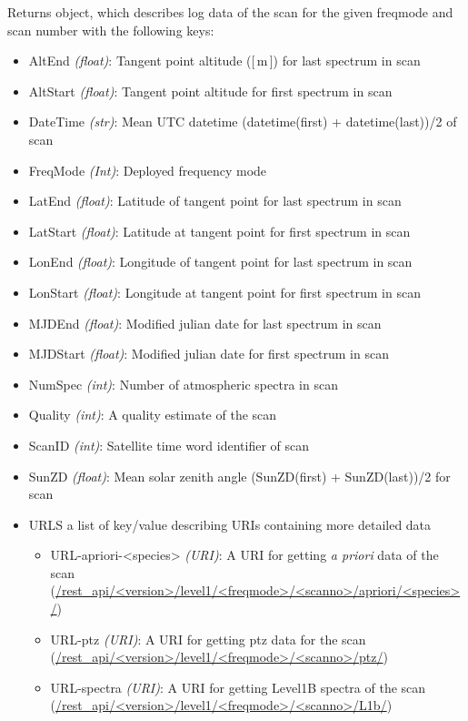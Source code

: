 Returns object, which describes log data of the scan for the given freqmode and scan number
with the following keys:


\begin{itemize}
    \item AltEnd \emph{(float)}: Tangent point altitude ([\,m\,]) for last spectrum in scan
    \item AltStart \emph{(float)}: Tangent point altitude for first spectrum in scan
    \item DateTime \emph{(str)}: Mean UTC datetime (datetime(first) + datetime(last))/2 of scan
    \item FreqMode \emph{(Int)}: Deployed frequency mode
    \item LatEnd \emph{(float)}: Latitude of tangent point for last spectrum in scan
    \item LatStart \emph{(float)}: Latitude at tangent point for first spectrum in scan
    \item LonEnd \emph{(float)}: Longitude of tangent point for last spectrum in scan
    \item LonStart \emph{(float)}: Longitude at tangent point for first spectrum in scan
    \item MJDEnd \emph{(float)}: Modified julian date for last spectrum in scan
    \item MJDStart \emph{(float)}: Modified julian date for first spectrum in scan
    \item NumSpec \emph{(int)}: Number of atmospheric spectra in scan
    \item Quality \emph{(int)}: A quality estimate of the scan
    \item ScanID \emph{(int)}: Satellite time word identifier of scan
    \item SunZD \emph{(float)}: Mean solar zenith angle  (SunZD(first) + SunZD(last))/2 for scan
    \item URLS a list of key/value describing URIs containing more detailed data
    \begin{itemize} 
        \item URL-apriori-<species> \emph{(URI)}: 
        A URI for getting \textit{a priori} data of the scan\\
        (\url{/rest_api/<version>/level1/<freqmode>/<scanno>/apriori/<species>/})
        \item URL-ptz \emph{(URI)}: A URI for getting ptz data for the scan\\
        (\url{/rest_api/<version>/level1/<freqmode>/<scanno>/ptz/})
        \item URL-spectra \emph{(URI)}: A URI for getting Level1B spectra of the scan\\         
        (\url{/rest_api/<version>/level1/<freqmode>/<scanno>/L1b/})        
    \end{itemize}
\end{itemize}   


